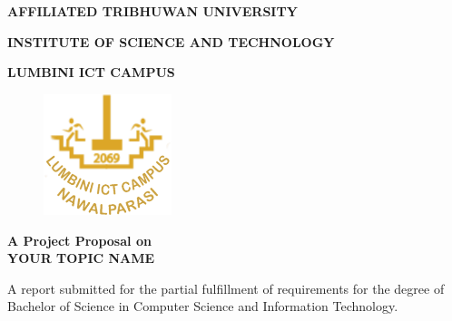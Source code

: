 

\begin{titlepage}
\vspace*{\fill}
\begin{centering}

    \begin{spacing}{2}
    \textbf{\Huge\uppercase{Affiliated Tribhuwan University}}


    \textbf{\Huge\uppercase{Institute of Science and Technology}}


    \textbf{\Huge\uppercase{Lumbini ICT Campus}}
    
    \vspace{15pt}
    \begin{figure}[ht!]
        \centering
        \includegraphics[height=100pt]{images/logo}
    \end{figure}


    \end{spacing}
    
    \begin{spacing}{1.8}
    \textbf{A Project Proposal on}
    \\


    \textbf{\Huge{YOUR TOPIC NAME}}
    
    \end{spacing}

    \begin{spacing}{1.3}
        A report submitted for the partial fulfillment of requirements for the degree of Bachelor of Science in Computer Science and Information Technology.
    \end{spacing}


\end{centering}
\end{titlepage}
